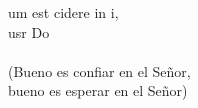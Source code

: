 \begin{cancion}%
	um est cidere in i,\\
	usr Do\\
	\jump\\
(Bueno es confiar en el Señor,\\
 bueno es esperar en el Señor)\\
\end{cancion}%
